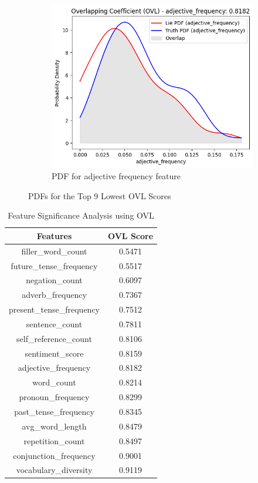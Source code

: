 \documentclass[12pt]{article}
\begin{document}
\begin{figure}
    \begin{subfigure}{0.5\textwidth}
        \includegraphics[width=\textwidth]{Figures/adj_frequency.png}
        \caption{PDF for adjective frequency feature}
        \label{fig:9}
    \end{subfigure}
      
    \caption{PDFs for the Top 9 Lowest OVL Scores}
    \label{fig:myFig}
\end{figure}

\begin{table}[H] %
\centering
\begin{tabular}{c c}
\hline
\textbf{Features} & \textbf{OVL Score} \\
\hline
filler\_word\_count & 0.5471 \\
future\_tense\_frequency & 0.5517 \\
negation\_count & 0.6097 \\
adverb\_frequency & 0.7367 \\
present\_tense\_frequency & 0.7512\\
sentence\_count & 0.7811 \\
self\_reference\_count & 0.8106 \\
sentiment\_score & 0.8159 \\
adjective\_frequency & 0.8182 \\
word\_count & 0.8214 \\
pronoun\_frequency & 0.8299 \\
past\_tense\_frequency & 0.8345 \\
avg\_word\_length & 0.8479 \\
repetition\_count & 0.8497 \\
conjunction\_frequency & 0.9001 \\
vocabulary\_diversity & 0.9119 \\
\hline
\end{tabular}
\caption{Feature Significance Analysis using OVL}
\label{tab:feature-ovl}
\end{table}
\end{document}
